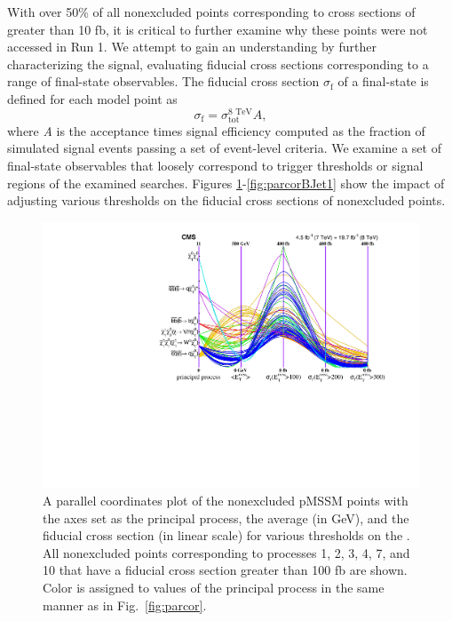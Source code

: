 With over 50\%
of all nonexcluded points corresponding to cross sections of
greater than 10 fb, it is critical to further examine why these points were not accessed in Run 1.  
We attempt to gain an
understanding by further characterizing the signal, evaluating fiducial cross sections corresponding to a
range of final-state observables. The fiducial cross section
$\sigma_{\text{f}}$ of a final-state is defined for each model point as 
 \begin{equation}
   \sigma_{\text{f}} = \sigma_{\text{tot}}^{\text{8 TeV}}A,
\end{equation}
where {\it A} is the acceptance times signal efficiency
computed as the fraction of simulated signal events
passing a set of event-level criteria. 
We examine a set of final-state observables that loosely correspond to trigger thresholds or
signal regions of the examined searches. Figures
\ref{fig:parcorMET}-\ref{fig:parcorBJet1} show the impact of adjusting
various thresholds on the fiducial cross sections of nonexcluded points.
\begin{figure}[h]
  \centering
         \includegraphics[width=1.0\textwidth]{figures/pMSSMpaper/parallel_coordinates/ParCorToposMET.pdf}
    \caption{A parallel coordinates plot of the nonexcluded pMSSM points
      with the axes set as the principal process, the average \MET{} (in GeV), and the 
    fiducial cross section (in linear scale) for various thresholds on the
    \MET{}. All nonexcluded points corresponding to processes 1, 2, 3,
    4, 7, and 10 that have a fiducial cross section greater than 100 fb are shown. Color is
    assigned to values of the principal process in the same manner as
    in Fig.~\ref{fig:parcor}.}
    \label{fig:parcorMET}
\end{figure}

